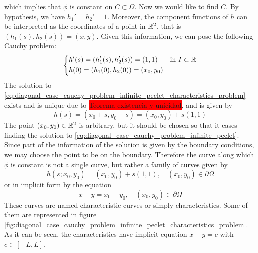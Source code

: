 which implies that $\phi$ is constant on $C \subset \Omega$. Now we would like to find $C$. By hypothesis, we have $h_1' = h_2' = 1$. Moreover, the component functions of $h$ can be interpreted as the coordinates of a point in $\mathbb{R}^2$, that is $(h_1(s), h_2(s)) = (x, y)$. Given this information, we can pose the following Cauchy problem:
\begin{equation} \label{eq:diagonal_case_cauchy_problem_infinite_peclet_characteristics_problem}
	\left\{
	\begin{aligned}
		&h'(s) = (h_1'(s), h_2'(s)) = (1, 1) & &\text{in } I \subset \mathbb{R} \\
		&h(0) = (h_1(0), h_2(0)) = (x_0, y_0)
	\end{aligned}
	\right.
\end{equation}
The solution to \eqref{eq:diagonal_case_cauchy_problem_infinite_peclet_characteristics_problem} exists and is unique due to \colorbox{red}{Teorema existencia y unicidad}, and is given by
\begin{equation}
	h(s) = (x_0 + s, y_0 + s) = (x_0, y_0) + s(1, 1)
\end{equation}
The point $(x_0, y_0) \in \mathbb{R}^2$ is arbitrary, but it should be chosen so that it eases finding the solution to \eqref{eq:diagonal_case_cauchy_problem_infinite_peclet}. Since part of the information of the solution is given by the boundary conditions, we may choose the point to be on the boundary. Therefore the curve along which $\phi$ is constant is not a single curve, but rather a family of curves given by
\begin{equation}
	h(s; x_0, y_0) = (x_0, y_0) + s(1, 1), \quad (x_0, y_0) \in \partial \Omega
\end{equation}
or in implicit form by the equation
\begin{equation} \label{eq:diagonal_case_cauchy_problem_infinite_peclet_characteristics_implicit_form}
	x - y = x_0 - y_0, \quad (x_0, y_0) \in \partial \Omega
\end{equation}
These curves are named characteristic curves or simply characteristics. Some of them are represented in figure \ref{fig:diagonal_case_cauchy_problem_infinite_peclet_characteristics_problem}. As it can be seen, the characteristics have implicit equation $x - y = c$ with $c \in [-L, L]$.

